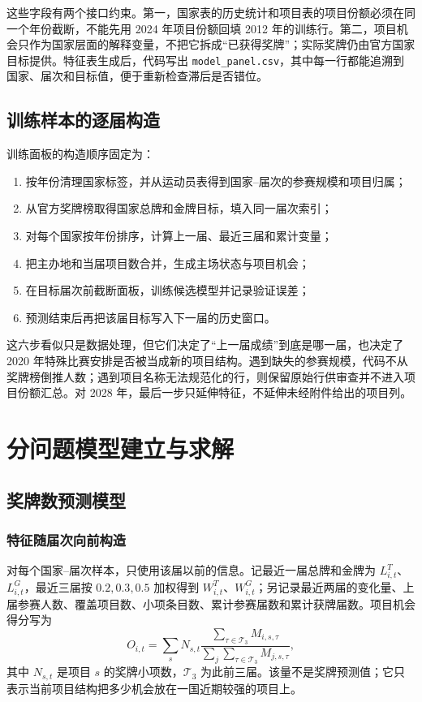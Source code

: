 \documentclass[UTF8,11pt,a4paper]{ctexart}
\begin{document}
这些字段有两个接口约束。第一，国家表的历史统计和项目表的项目份额必须在同一个年份截断，不能先用 2024 年项目份额回填 2012 年的训练行。第二，项目机会只作为国家层面的解释变量，不把它拆成“已获得奖牌”；实际奖牌仍由官方国家目标提供。特征表生成后，代码写出 \texttt{model\_panel.csv}，其中每一行都能追溯到国家、届次和目标值，便于重新检查滞后是否错位。

\subsection{训练样本的逐届构造}

训练面板的构造顺序固定为：
\begin{enumerate}[label=(\alph*)]
\item 按年份清理国家标签，并从运动员表得到国家--届次的参赛规模和项目归属；
\item 从官方奖牌榜取得国家总牌和金牌目标，填入同一届次索引；
\item 对每个国家按年份排序，计算上一届、最近三届和累计变量；
\item 把主办地和当届项目数合并，生成主场状态与项目机会；
\item 在目标届次前截断面板，训练候选模型并记录验证误差；
\item 预测结束后再把该届目标写入下一届的历史窗口。
\end{enumerate}
这六步看似只是数据处理，但它们决定了“上一届成绩”到底是哪一届，也决定了 2020 年特殊比赛安排是否被当成新的项目结构。遇到缺失的参赛规模，代码不从奖牌榜倒推人数；遇到项目名称无法规范化的行，则保留原始行供审查并不进入项目份额汇总。对 2028 年，最后一步只延伸特征，不延伸未经附件给出的项目列。

\section{分问题模型建立与求解}

\label{mcm-q1-start}
\subsection{奖牌数预测模型}

\subsubsection{特征随届次向前构造}

对每个国家--届次样本，只使用该届以前的信息。记最近一届总牌和金牌为 $L^T_{i,t}$、$L^G_{i,t}$，最近三届按 $0.2,0.3,0.5$ 加权得到 $W^T_{i,t}$、$W^G_{i,t}$；另记录最近两届的变化量、上届参赛人数、覆盖项目数、小项条目数、累计参赛届数和累计获牌届数。项目机会得分写为
\begin{equation}
O_{i,t}=\sum_s N_{s,t}\frac{\sum_{\tau\in\mathcal{T}_3}M_{i,s,\tau}}
{\sum_j\sum_{\tau\in\mathcal{T}_3}M_{j,s,\tau}},
\label{eq:opportunity}
\end{equation}
其中 $N_{s,t}$ 是项目 $s$ 的奖牌小项数，$\mathcal{T}_3$ 为此前三届。该量不是奖牌预测值；它只表示当前项目结构把多少机会放在一国近期较强的项目上。
\end{document}
